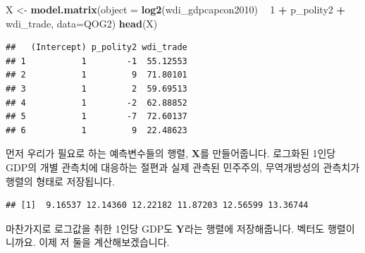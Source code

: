 \documentclass[
]{book}
\newenvironment{Shaded}{\begin{snugshade}}{\end{snugshade}}
\newcommand{\DataTypeTok}[1]{\textcolor[rgb]{0.13,0.29,0.53}{#1}}
\newcommand{\DecValTok}[1]{\textcolor[rgb]{0.00,0.00,0.81}{#1}}
\newcommand{\KeywordTok}[1]{\textcolor[rgb]{0.13,0.29,0.53}{\textbf{#1}}}
\newcommand{\NormalTok}[1]{#1}
\newcommand{\OperatorTok}[1]{\textcolor[rgb]{0.81,0.36,0.00}{\textbf{#1}}}
\newcommand{\StringTok}[1]{\textcolor[rgb]{0.31,0.60,0.02}{#1}}
\begin{document}
\begin{Shaded}
\begin{Highlighting}[]
\NormalTok{X <-}\StringTok{ }\KeywordTok{model.matrix}\NormalTok{(}\DataTypeTok{object =} \KeywordTok{log2}\NormalTok{(wdi_gdpcapcon2010) }\OperatorTok{~}\StringTok{ }\DecValTok{1} \OperatorTok{+}\StringTok{  }
\StringTok{                    }\NormalTok{p_polity2 }\OperatorTok{+}\StringTok{ }\NormalTok{wdi_trade, }\DataTypeTok{data=}\NormalTok{QOG2)}
\KeywordTok{head}\NormalTok{(X)}
\end{Highlighting}
\end{Shaded}

\begin{verbatim}
##   (Intercept) p_polity2 wdi_trade
## 1           1        -1  55.12553
## 2           1         9  71.80101
## 3           1         2  59.69513
## 4           1        -2  62.88852
## 5           1        -7  72.60137
## 6           1         9  22.48623
\end{verbatim}

먼저 우리가 필요로 하는 예측변수들의 행렬, \(\textbf{X}\)를 만들어줍니다. 로그화된 1인당 GDP의 개별 관측치에 대응하는 절편과 실제 관측된 민주주의, 무역개방성의 관측치가 행렬의 형태로 저장됩니다.

\begin{Shaded}
\end{Shaded}

\begin{verbatim}
## [1]  9.16537 12.14360 12.22182 11.87203 12.56599 13.36744
\end{verbatim}

마찬가지로 로그값을 취한 1인당 GDP도 \(\textbf{Y}\)라는 행렬에 저장해줍니다. 벡터도 행렬이니까요. 이제 저 둘을 계산해보겠습니다.

\begin{Shaded}
\end{Shaded}
\end{document}
